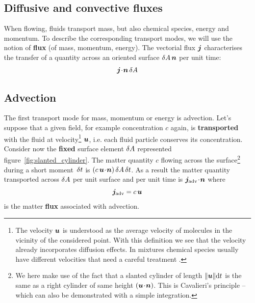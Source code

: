 \subsection{Diffusive and convective fluxes}
\label{sec:flux}
When flowing, fluids transport mass, but also chemical species, energy and momentum. To describe the corresponding transport modes, we will use the notion of \textbf{flux} (of mass, momentum, energy).
The vectorial flux $\bj$ characterises the transfer of a quantity across an oriented surface $\delA \,\bn$ per unit time:
\begin{equation}
\bj \!\cdot\! \bn \,\delA
\end{equation}
\subsection{Advection}
\label{sec:advection}
The first transport mode for mass, momentum or energy is advection.
Let's suppose that a given field, for example concentration $c$ again, is \textbf{transported} with the fluid at velocity\footnote{The velocity $\bu$ is understood as the average velocity of molecules in the vicinity of the considered point. With this definition we see that the velocity already incorporates  diffusion effects. In mixtures chemical species usually have different velocities that need a careful treatment \citep[][\S17.7]{Bird2002}.} $\bu$, i.e. each fluid particle conserves its concentration. Consider now the \textbf{fixed} surface element $\delta A$ represented figure~\ref{fig:slanted_cylinder}. The matter quantity $c$ flowing across the surface\footnote{We here make use of the fact that a slanted cylinder of length $\|\bu\| \mathrm dt$ is the same as a right cylinder of same height $\lp\bu\!\cdot\!\bn\rp$. This is Cavalieri's principle -- which can also be demonstrated with a simple integration.} during a short moment~$\delta t$ is $\lp c \,\bu \!\cdot\! \bn\rp \delA \,\delt$. 
As a result the matter quantity transported across $\delta A$ per unit surface and per unit time is $\bj_\text{adv} \!\cdot\! \bn$ where 
\begin{equation}
\bj_\text{adv} = c\, \bu
\end{equation}
is the matter \textbf{flux} associated with advection.  
